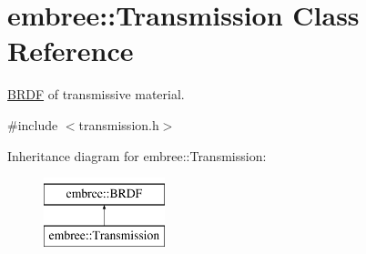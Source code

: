\hypertarget{classembree_1_1_transmission}{
\section{embree::Transmission Class Reference}
\label{classembree_1_1_transmission}
}


\hyperlink{classembree_1_1_b_r_d_f}{BRDF} of transmissive material.  




{\ttfamily \#include $<$transmission.h$>$}

Inheritance diagram for embree::Transmission:\begin{figure}[H]
\begin{center}
\leavevmode
\includegraphics[height=2.000000cm]{classembree_1_1_transmission}
\end{center}
\end{figure}
